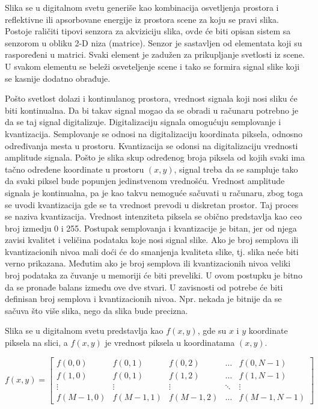 \documentclass[a4paper,12pt,titlepage]{article}
\begin{document}
Slika se u digitalnom svetu generiše kao kombinacija osvetljenja prostora i reflektivne ili apsorbovane energije iz prostora scene za koju se pravi slika. Postoje raličiti tipovi senzora za akviziciju slika, ovde će biti opisan sistem sa senzorom u obliku 2-D niza (matrice). Senzor je sastavljen od elementata koji su raspoređeni u matrici. Svaki element je zadužen za prikupljanje svetlosti iz scene. U svakom elementu se beleži osveteljenje scene i tako se formira signal slike koji se kasnije dodatno obrađuje.

Pošto svetlost dolazi i kontinulanog prostora, vrednost signala koji nosi sliku će biti kontinualna. Da bi takav signal mogao da se obradi u računaru potrebno je da se taj signal digitalizuje. Digitalizaciju signala omogućuju semplovanje i kvantizacija. Semplovanje se odnosi na digitalizaciju koordinata piksela, odnosno određivanja mesta u prostoru. Kvantizacija se odonsi na digitalizaciju vrednosti amplitude signala. Pošto je slika skup određenog broja piksela od kojih svaki ima tačno određene koordinate u prostoru $(x, y)$, signal treba da se sampluje tako da svaki piksel bude popunjen jedinstvenom vrednošću. Vrednost amplitude signala je kontinualna, pa je kao takvu nemoguće sačuvati u računaru, zbog toga se uvodi kvantizacija gde se ta vrednost prevodi u diskretan prostor. Taj proces se naziva kvantizacija. Vrednost intenziteta piksela se obično predstavlja kao ceo broj izmedju 0 i 255. Postupak semplovanja i kvantizacije je bitan, jer od njega zavisi kvalitet i veličina podataka koje nosi signal slike. Ako je broj semplova ili kvantizacionih nivoa mali doći će do smanjenja kvaliteta slike, tj. slika neće biti verno prikazana. Međutim ako je broj  semplova ili kvantizacionih nivoa veliki broj podataka za čuvanje u memoriji će biti preveliki. U ovom postupku je bitno da se pronađe balans između ove dve stvari. U zavisnosti od potrebe će biti definisan broj semplova i kvantizacionih nivoa. Npr. nekada je bitnije da se sačuva što više slika, nego da slika bude precizna.  

Slika se u digitalnom svetu predstavlja kao $f(x, y)$, gde su $x$ i $y$ koordinate piksela na slici, a $f(x, y)$ je vrednost piksela u koordinatama $(x, y)$. 

\begin{equation}\label{eq:slika}
f(x, y)
=
\begin{bmatrix}
    f(0, 0) & f(0, 1) & f(0, 2) & \dots  & f(0, N - 1) \\
    f(1, 0) & f(0, 1) & f(1, 2) & \dots  & f(1, N - 1) \\
    \vdots & \vdots & \vdots & \ddots & \vdots \\
    f(M - 1, 0) & f(M - 1, 1) & f(M - 1, 2) & \dots  & f(M - 1, N - 1)
\end{bmatrix}
\end{equation}
\end{document}
